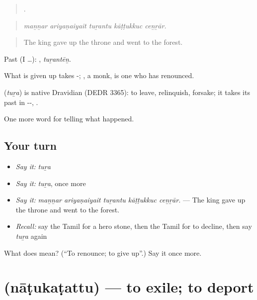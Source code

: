 \begin{quote}
    .
\end{quote}

\begin{quote}
\emph{maṉṉar ariyaṇaiyait tuṟantu kāṭṭukkuc ceṉṟār.}
\end{quote}

\begin{quote}
The king gave up the throne and went to the forest.
\end{quote}

Past (I …): , \emph{tuṟantēṉ}.

What is given up takes -; , a monk, is one who has renounced.

\begin{cousinweb}
\textbf{} (\emph{tuṟa}) is native Dravidian (DEDR 3365): to leave, relinquish, forsake; it takes its past in --, .
\end{cousinweb}

\begin{grammarlens}[title={What you've built}]
One more word for telling what happened.
\end{grammarlens}

\subsection*{Your turn}
\begin{itemize}
\raggedright
  \item \emph{Say it:} \emph{tuṟa}
  \item \emph{Say it:} \emph{tuṟa}, once more
  \item \emph{Say it:} \emph{maṉṉar ariyaṇaiyait tuṟantu kāṭṭukkuc ceṉṟār.} — The king gave up the throne and went to the forest.
  \item \emph{Recall:} say the Tamil for a hero stone, then the Tamil for to decline, then say \emph{tuṟa} again
\end{itemize}

\begin{tcolorbox}[breakable,colback=teal!4,colframe=teal!35!black,title={Before you move on}]
What does  mean? (\textquotedblleft{}To renounce; to give up\textquotedblright{}.) Say it once more.
\end{tcolorbox}
\section[\texorpdfstring{\ta{நாடுகடத்து} (nāṭukaṭattu)}{நாடுகடத்து (nāṭukaṭattu)}]{ (nāṭukaṭattu) — to exile; to deport}

